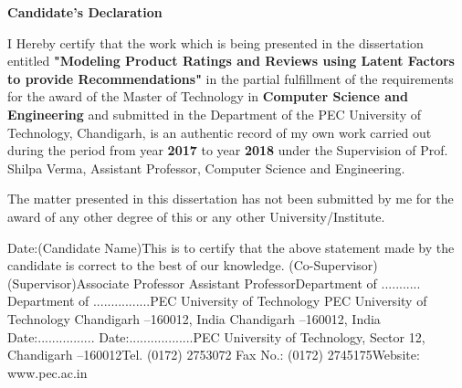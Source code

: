 \documentclass[20pt,a4paper]{extarticle}
\begin{document}
\justify
\begin{center}
\textbf{Candidate's Declaration}
\end{center}
I Hereby  certify  that  the  work  which  is  being  presented  in  the dissertation entitled \textbf{"Modeling Product Ratings and Reviews using Latent Factors to provide Recommendations"} in  the partial fulfillment of the requirements for the award of the Master of Technology in \textbf{Computer Science and Engineering} and submitted in the Department of the PEC University of Technology, Chandigarh, is  an  authentic record of my own work carried out during the period from year \textbf{2017} to year \textbf{2018} under the Supervision of Prof. Shilpa Verma, Assistant Professor, Computer Science and Engineering. \par
The  matter  presented  in  this dissertation has  not  been  submitted  by  me  for  the  award  of  any other degree of this or any other University/Institute. \par

Date:(Candidate Name)This  is  to  certify  that  the  above  statement  made  by  the  candidate  is  correct  to  the  best  of  our knowledge. (Co-Supervisor)(Supervisor)Associate Professor                                                         Assistant ProfessorDepartment of ...........                   Department of ................PEC University of Technology                                        PEC University of Technology                                                        Chandigarh –160012, India                                            Chandigarh –160012, India                                                                                                   Date:................                                                           Date:..................PEC University of Technology, Sector 12, Chandigarh –160012Tel. (0172) 2753072 Fax No.: (0172) 2745175Website: www.pec.ac.in
\end{document}

